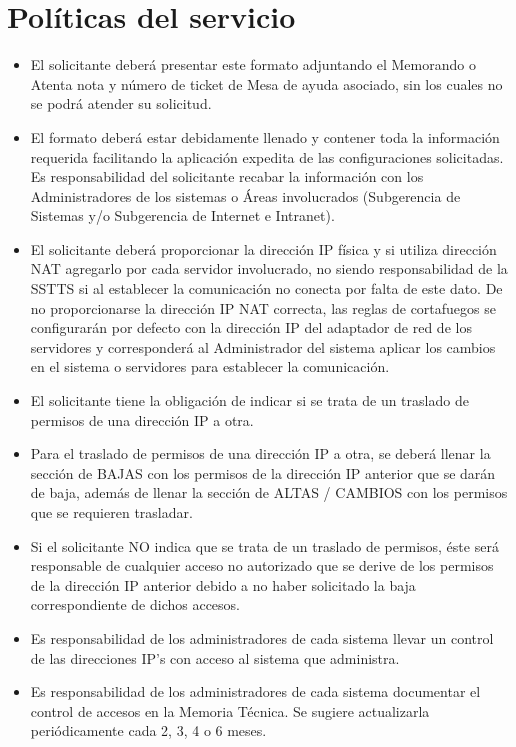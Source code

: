 \documentclass[a4paper,landscape]{article}
\begin{document}
\clearpage
\section*{Políticas del servicio}
{\small \begin{itemize}
	        \item El solicitante deberá presentar este formato adjuntando el Memorando o Atenta nota y número de ticket de Mesa de ayuda asociado, sin los cuales no se podrá atender su solicitud.  
	        \item El formato deberá estar debidamente llenado y contener toda la información requerida facilitando la aplicación expedita de las configuraciones solicitadas. Es responsabilidad del solicitante recabar la información con los Administradores de los sistemas o Áreas involucrados (Subgerencia de Sistemas y/o Subgerencia de Internet e Intranet).
           \item El solicitante deberá proporcionar la dirección IP física y si utiliza dirección NAT agregarlo por cada servidor involucrado, no siendo responsabilidad de la SSTTS si al establecer la comunicación no conecta por falta de este dato. De no proporcionarse la dirección IP NAT correcta, las reglas de cortafuegos se configurarán por defecto con la dirección IP del adaptador de red de los servidores y corresponderá al Administrador del sistema aplicar los cambios en el sistema o servidores para establecer la comunicación.
           \item El solicitante tiene la obligación de indicar si se trata de un traslado de permisos de una dirección IP a otra.
           \item Para el traslado de permisos de una dirección IP a otra, se deberá llenar la sección de BAJAS con los permisos de la dirección IP anterior que se darán de baja, además de llenar la sección de ALTAS / CAMBIOS con los permisos que se requieren trasladar.
           \item Si el solicitante NO indica que se trata de un traslado de permisos, éste será responsable de cualquier acceso no autorizado que se derive de los permisos de la dirección IP anterior debido a no haber solicitado la baja correspondiente de dichos accesos.
           \item Es responsabilidad de los administradores de cada sistema llevar un control de las direcciones IP’s con acceso al sistema que administra.
           \item Es responsabilidad de los administradores de cada sistema documentar el control de accesos en la Memoria Técnica. Se sugiere actualizarla periódicamente cada 2, 3, 4 o 6 meses.

\end{itemize}}
\end{document}
